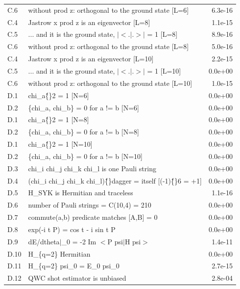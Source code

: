 \begin{tabular}{l p{10.4cm} r}
C.6 & without prod z: orthogonal to the ground state  [L=6] & 6.3e-16 \\
C.4 & Jastrow x prod z is an eigenvector   [L=8] & 1.1e-15 \\
C.5 & ... and it is the ground state, $|$$<$.$|$.$>$$|$ = 1   [L=8] & 8.9e-16 \\
C.6 & without prod z: orthogonal to the ground state  [L=8] & 5.0e-16 \\
C.4 & Jastrow x prod z is an eigenvector   [L=10] & 2.2e-15 \\
C.5 & ... and it is the ground state, $|$$<$.$|$.$>$$|$ = 1   [L=10] & 0.0e+00 \\
C.6 & without prod z: orthogonal to the ground state  [L=10] & 1.0e-15 \\
D.1 & chi\_a\^\{\}2 = 1   [N=6] & 0.0e+00 \\
D.2 & \{chi\_a, chi\_b\} = 0 for a != b   [N=6] & 0.0e+00 \\
D.1 & chi\_a\^\{\}2 = 1   [N=8] & 0.0e+00 \\
D.2 & \{chi\_a, chi\_b\} = 0 for a != b   [N=8] & 0.0e+00 \\
D.1 & chi\_a\^\{\}2 = 1   [N=10] & 0.0e+00 \\
D.2 & \{chi\_a, chi\_b\} = 0 for a != b   [N=10] & 0.0e+00 \\
D.3 & chi\_i chi\_j chi\_k chi\_l is one Pauli string & 0.0e+00 \\
D.4 & (chi\_i chi\_j chi\_k chi\_l)\^\{\}dagger = itself  [(-1)\^\{\}6 = +1] & 0.0e+00 \\
D.5 & H\_SYK is Hermitian and traceless & 1.1e-16 \\
D.6 & number of Pauli strings = C(10,4) = 210 & 0.0e+00 \\
D.7 & commute(a,b) predicate matches [A,B] = 0 & 0.0e+00 \\
D.8 & exp(-i t P) = cos t - i sin t P & 0.0e+00 \\
D.9 & dE/dtheta$|$\_0 = -2 Im $<$P psi$|$H psi$>$ & 1.4e-11 \\
D.10 & H\_\{q=2\} Hermitian & 0.0e+00 \\
D.11 & H\_\{q=2\} psi\_0 = E\_0 psi\_0 & 2.7e-15 \\
D.12 & QWC shot estimator is unbiased & 2.8e-04 \\
\bottomrule
\end{tabular}
